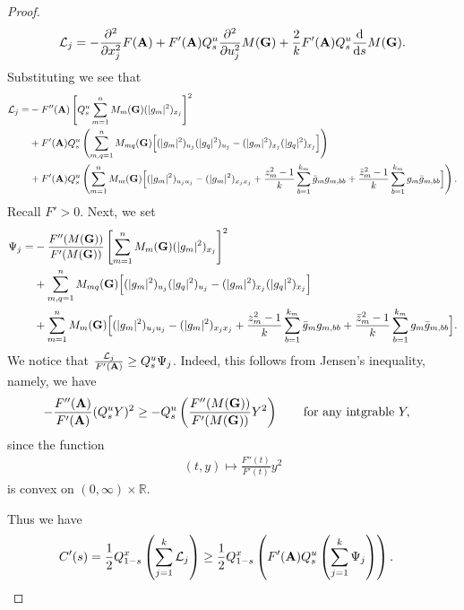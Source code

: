\documentclass[9pt, a4paper]{amsart}
\newcommand{\R}{\mathbb{R}}
\newcommand{\1}{{\chi_{}}}%
\numberwithin{equation}{section}
\begin{document}
\begin{proof}
\begin{align*}
			\mathcal{L}_j=-	\frac{\partial^2}{\partial x_j^2}F({\bf{A}})+  F'({\bf{A}}) Q_s^u \frac{\partial^2}{\partial u_j^2}M({\bf{G}})+\frac{2}{k}F'({\bf{A}})Q_s^u\frac{\mathrm{d}}{\mathrm{d}s}M({\bf{G}}).
		\end{align*}
		Substituting we see that
		\begin{align*}
			\mathcal{L}_j=&-F''({\bf{A}})\left[Q_s^u\sum_{m=1}^nM_{m}({\bf{G}})(|g_m|^2)_{x_j}\right]^2\\   
			&+F'({\bf{A}})Q_s^u\left(\sum_{m, q=1}^{n}M_{mq}({\bf{G}})\Big[(|g_m|^2)_{u_j}(|g_q|^2)_{u_j}-(|g_m|^2)_{x_j}(|g_q|^2)_{x_j}\Big] \right)\\
			&+F'({\bf{A}})Q_s^u\left(\sum_{m=1}^nM_{m}({\bf{G}})\Big[(|g_m|^2)_{u_ju_j}-(|g_m|^2)_{x_jx_j}+\frac{z_m^2-1}{k}\sum_{b=1}^{k_m}\bar{g}_mg_{m,bb}+\frac{\bar{z}_m^2-1}{k}\sum_{b=1}^{k_m}g_m\bar{g}_{m,bb}\Big]\right).
		\end{align*}
		Recall $F'>0$. Next, we set
		\begin{align*}
			\Psi_j=&-\frac{F''({M(\bf{G}}))}{F'(M({\bf{G}}))}\left[\sum_{m=1}^nM_{m}({\bf{G}})(|g_m|^2)_{x_j}\right]^2\\   
			&+\sum_{m, q=1}^{n}M_{mq}({\bf{G}})\Big[(|g_m|^2)_{u_j}(|g_q|^2)_{u_j}-(|g_m|^2)_{x_j}(|g_q|^2)_{x_j}\Big] \\
			&+\sum_{m=1}^nM_{m}({\bf{G}})\Big[(|g_m|^2)_{u_ju_j}-(|g_m|^2)_{x_jx_j}+\frac{z_m^2-1}{k}\sum_{b=1}^{k_m}\bar{g}_mg_{m,bb}+\frac{\bar{z}_m^2-1}{k}\sum_{b=1}^{k_m}g_m\bar{g}_{m,bb}\Big].
		\end{align*}
		We notice that $\frac{\mathcal{L}_j}{F'({\bf{A}})}\geq Q_s^u\Psi_j$. Indeed, this follows from Jensen's inequality, namely,  we have
		\begin{align*}
			- \frac{F''({\bf{A}})}{F'({\bf{A}})}(Q_s^uY)^2 &\geq- Q_{s}^{u}\left( \frac{F''(M({\bf{G}}))}{F'(M({\bf{G}}))}Y^2\right)  \qquad \text{for any intgrable} \ Y,
		\end{align*}
		since the function 
		\begin{align*}
			(t,y)\mapsto \frac{F''(t)}{F'(t)}y^2
		\end{align*}
		is convex on $(0,\infty)\times \R$. 

        Thus we have 
        \begin{align*}
            &C'(s)=\frac{1}{2}Q_{1-s}^{x}\left(\sum_{j=1}^{k} \mathcal{L}_{j}\right) \geq \frac{1}{2}Q_{1-s}^{x}\left(F'({\bf A})Q_{s}^{u} \left(\sum_{j=1}^{k} \Psi_{j} \right)\right).
        \end{align*}
        

\end{proof}
\end{document}
